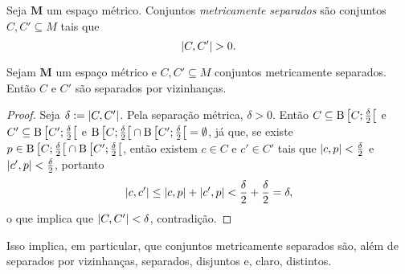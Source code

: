 \begin{definition}
Seja $\bm M$ um espaço métrico. Conjuntos \emph{metricamente separados} são conjuntos $C,C' \subseteq M$ tais que
	\begin{equation*}
	\left\vert{C},{C'}\right\vert > 0.
	\end{equation*}
\end{definition}

\begin{proposition}
Sejam $\bm M$ um espaço métrico e $C,C' \subseteq M$ conjuntos metricamente separados. Então $C$ e $C'$ são separados por vizinhanças.
\end{proposition}
\begin{proof}
Seja $\delta := \left\vert{C},{C'}\right\vert$. Pela separação métrica, $\delta > 0$. Então $C \subseteq \mathrm{B}\left[{C};{\frac{\delta}{2}}\right[$ e $C' \subseteq \mathrm{B}\left[{C'};{\frac{\delta}{2}}\right[$ e $\mathrm{B}\left[{C};{\frac{\delta}{2}}\right[ \cap \mathrm{B}\left[{C'};{\frac{\delta}{2}}\right[ = \emptyset$, já que, se existe $p \in \mathrm{B}\left[{C};{\frac{\delta}{2}}\right[ \cap \mathrm{B}\left[{C'};{\frac{\delta}{2}}\right[$, então existem $c \in C$ e $c' \in C'$ tais que $\left\vert{c},{p}\right\vert < \frac{\delta}{2}$ e $\left\vert{c'},{p}\right\vert < \frac{\delta}{2}$, portanto
	\begin{equation*}
	\left\vert{c},{c'}\right\vert \leq \left\vert{c},{p}\right\vert + \left\vert{c'},{p}\right\vert < \frac{\delta}{2}+\frac{\delta}{2} = \delta,
	\end{equation*}
o que implica que $\left\vert{C},{C'}\right\vert<\delta$, contradição.
\end{proof}

Isso implica, em particular, que conjuntos metricamente separados são, além de separados por vizinhanças, separados, disjuntos e, claro, distintos.

